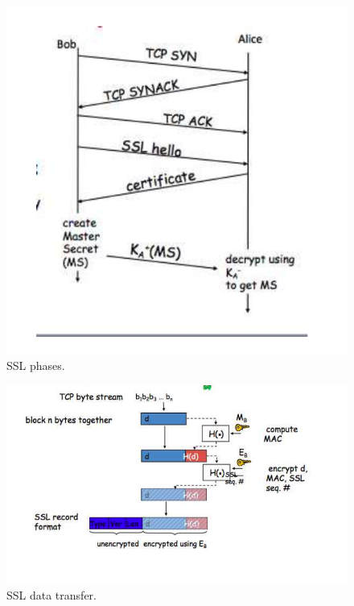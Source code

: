 \documentclass[twoside]{article}
\begin{document}
\begin{figure}
  \includegraphics[width=\linewidth]{ssl-phases.png}
  \caption{SSL phases.}
  \label{fig:ssl-phases}
\end{figure}
\begin{figure}
  \includegraphics[width=\linewidth]{ssl-data-transfer.png}
  \caption{SSL data transfer.}
  \label{fig:ssl-data-transfer}
\end{figure}
\end{document}
